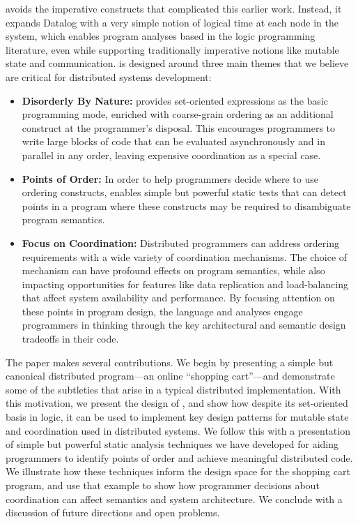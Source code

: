 \lang avoids the imperative constructs that complicated this earlier work.  Instead, it expands Datalog with a very simple notion of logical time at each node in the system, which enables program analyses based in the logic programming literature, even while supporting traditionally imperative notions like mutable state and communication.  \lang is designed around three main themes that we believe are critical for distributed systems development:
\begin{itemize}
    \item {\bf Disorderly By Nature:} \lang provides set-oriented expressions as the basic programming mode, enriched with coarse-grain ordering as an additional construct at the programmer's disposal.  This encourages programmers to write large blocks of code that can be evaluated asynchronously and in parallel in any order, leaving expensive coordination as a special case.
    \item {\bf Points of Order:} In order to help programmers decide where to use ordering constructs, \lang enables simple but powerful static tests that can detect points in a program where these constructs may be required to disambiguate program semantics. %
    \item {\bf Focus on Coordination:} Distributed programmers can address ordering requirements with a wide variety of coordination mechanisms. The choice of mechanism can have profound effects on program semantics, while also impacting opportunities for features like data replication and load-balancing that affect system availability and performance.  By focusing attention on these points in program design, the language and analyses engage programmers in thinking through the key architectural and semantic design tradeoffs in their code.
\end{itemize}

The paper makes several contributions.  We begin by presenting a simple but canonical distributed program---an online ``shopping cart''---and demonstrate some of the subtleties that arise in a typical distributed implementation.  With this motivation, we present the design of \lang, and show how despite its set-oriented basis in logic, it can be used to implement key design patterns for mutable state and coordination used in distributed systems.  We follow this with a presentation of simple but powerful static analysis techniques we have developed for aiding programmers to identify points of order and achieve meaningful 
distributed code.  We illustrate how these techniques inform the design space for the shopping cart program, and use that example to show how programmer decisions about coordination can affect semantics and system architecture.  We conclude with a discussion of future directions and open problems.
